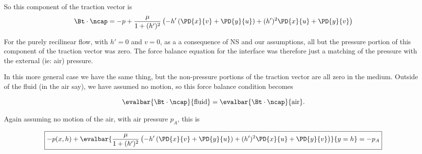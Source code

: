 So this component of the traction vector is
\begin{equation}\label{eqn:inclinedFlowWithoutConstantHeightAssumption:240}
\Bt \cdot \ncap 
=
-p
+
\frac{\mu}{1 + (h')^2}
\left(
- h' 
\left( 
\PD{x}{v} +
\PD{y}{u}
\right)
+ (h')^2 \PD{x}{u} 
 + \PD{y}{v} 
\right)
\end{equation}

For the purely recilinear flow, with $h' = 0$ and $v = 0$, as a a consequence of NS and our assumptions, all but the pressure portion of this component of the traction vector was zero.  The force balance equation for the interface was therefore just a matching of the pressure with the external (ie: air) pressure.

In this more general case we have the same thing, but the non-pressure portions of the traction vector are all zero in the medium.  Outside of the fluid (in the air say), we have assumed no motion, so this force balance condition becomes

\begin{equation}\label{eqn:inclinedFlowWithoutConstantHeightAssumption:260}
\evalbar{\Bt \cdot \ncap}{\text{fluid}}
=
\evalbar{\Bt \cdot \ncap}{\text{air}}.
\end{equation}

Again assuming no motion of the air, with air pressure $p_A$, this is

\begin{equation}\label{eqn:inclinedFlowWithoutConstantHeightAssumption:280}
\boxed{
-p(x, h)
+
\evalbar{
\frac{\mu}{1 + (h')^2}
\left(
- h' 
\left( 
\PD{x}{v} +
\PD{y}{u}
\right)
+ (h')^2 \PD{x}{u} 
 + \PD{y}{v} 
\right)
}{y = h}
= -p_A
}
\end{equation}

\EndNoBibArticle
